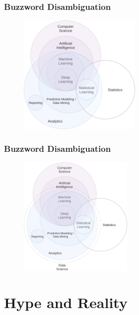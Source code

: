 \documentclass[11pt,
               aspectratio=169
               ]{beamer}
\begin{document}
		\begin{frame}
		
			\frametitle{Buzzword Disambiguation}
			
			\begin{figure}[htb]
				\begin{center}
					\includegraphics[height=165pt, angle=1]{img/cs_stat_an.png}
					\label{fig:cs}
				\end{center}
			\end{figure}
		
		\end{frame}
	
		\begin{frame}
		
			\frametitle{Buzzword Disambiguation}
			
			\begin{figure}[htb]
				\begin{center}
					\includegraphics[height=165pt, angle=1]{img/cs_stat_an_ds.png}
					\label{fig:cs}
				\end{center}
			\end{figure}
		
		\end{frame}	
	
	
	\section{Hype and Reality}
	
\end{document}
